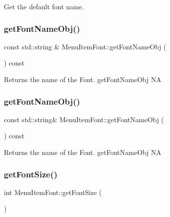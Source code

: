 Get the default font name. \mbox{\label{classMenuItemFont_a602990369beef06457153f39aefa42b9}} 
\subsubsection{\texorpdfstring{get\+Font\+Name\+Obj()}{getFontNameObj()}\hspace{0.1cm}{\footnotesize\ttfamily [1/2]}}
{\footnotesize\ttfamily const std\+::string \& Menu\+Item\+Font\+::get\+Font\+Name\+Obj (\begin{DoxyParamCaption}{ }\end{DoxyParamCaption}) const}

Returns the name of the Font.  get\+Font\+Name\+Obj  NA \mbox{\label{classMenuItemFont_aa871b31127d3c1a44e0795a1f12c4dfe}} 
\subsubsection{\texorpdfstring{get\+Font\+Name\+Obj()}{getFontNameObj()}\hspace{0.1cm}{\footnotesize\ttfamily [2/2]}}
{\footnotesize\ttfamily const std\+::string\& Menu\+Item\+Font\+::get\+Font\+Name\+Obj (\begin{DoxyParamCaption}{ }\end{DoxyParamCaption}) const}

Returns the name of the Font.  get\+Font\+Name\+Obj  NA \mbox{\label{classMenuItemFont_a5a19c21d111b5a0b79708777d10346cf}} 
\subsubsection{\texorpdfstring{get\+Font\+Size()}{getFontSize()}\hspace{0.1cm}{\footnotesize\ttfamily [1/2]}}
{\footnotesize\ttfamily int Menu\+Item\+Font\+::get\+Font\+Size (\begin{DoxyParamCaption}{ }\end{DoxyParamCaption})\hspace{0.3cm}{\ttfamily [static]}}

